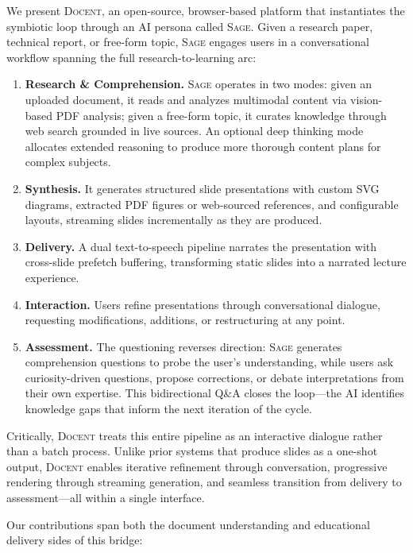 \documentclass[11pt,a4paper]{article}
\newcommand{\system}{\textsc{Docent}\xspace}
\newcommand{\sage}{\textsc{Sage}\xspace}
\begin{document}
We present \system, an open-source, browser-based platform that instantiates the symbiotic loop through an AI persona called \sage.
Given a research paper, technical report, or free-form topic, \sage engages users in a conversational workflow spanning the full research-to-learning arc:

\begin{enumerate}[leftmargin=*,nosep]
    \item \textbf{Research \& Comprehension.} \sage operates in two modes: given an uploaded document, it reads and analyzes multimodal content via vision-based PDF analysis; given a free-form topic, it curates knowledge through web search grounded in live sources. An optional deep thinking mode allocates extended reasoning to produce more thorough content plans for complex subjects.
    \item \textbf{Synthesis.} It generates structured slide presentations with custom SVG diagrams, extracted PDF figures or web-sourced references, and configurable layouts, streaming slides incrementally as they are produced.
    \item \textbf{Delivery.} A dual text-to-speech pipeline narrates the presentation with cross-slide prefetch buffering, transforming static slides into a narrated lecture experience.
    \item \textbf{Interaction.} Users refine presentations through conversational dialogue, requesting modifications, additions, or restructuring at any point.
    \item \textbf{Assessment.} The questioning reverses direction: \sage generates comprehension questions to probe the user's understanding, while users ask curiosity-driven questions, propose corrections, or debate interpretations from their own expertise. This bidirectional Q\&A closes the loop---the AI identifies knowledge gaps that inform the next iteration of the cycle.
\end{enumerate}

Critically, \system treats this entire pipeline as an interactive dialogue rather than a batch process.
Unlike prior systems that produce slides as a one-shot output, \system enables iterative refinement through conversation, progressive rendering through streaming generation, and seamless transition from delivery to assessment---all within a single interface.

Our contributions span both the document understanding and educational delivery sides of this bridge:
\end{document}
